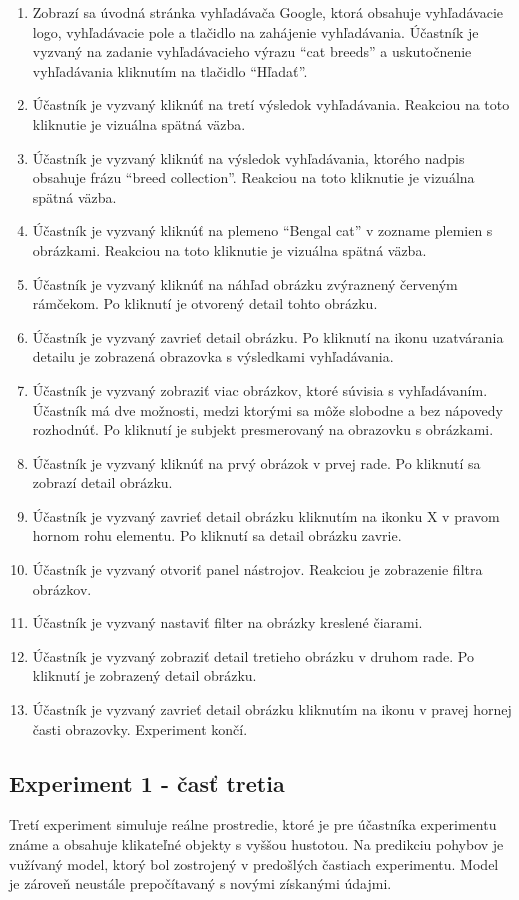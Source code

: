 {\small{}
\begin{enumerate}
\item Zobrazí sa úvodná stránka vyhľadávača Google, ktorá obsahuje vyhľadávacie logo, vyhľadávacie pole a tlačidlo na zahájenie vyhľadávania. Účastník je vyzvaný na zadanie vyhľadávacieho výrazu “cat breeds” a uskutočnenie vyhľadávania kliknutím na tlačidlo “Hľadať”.
\item Účastník je vyzvaný kliknúť na tretí výsledok vyhľadávania. Reakciou na toto kliknutie je vizuálna spätná väzba.
\item Účastník je vyzvaný kliknúť na výsledok vyhľadávania, ktorého nadpis obsahuje frázu “breed collection”. Reakciou na toto kliknutie je vizuálna spätná väzba.
\item Účastník je vyzvaný kliknúť na plemeno “Bengal cat” v zozname plemien s obrázkami. Reakciou na toto kliknutie je vizuálna spätná väzba.
\item Účastník je vyzvaný kliknúť na náhľad obrázku zvýraznený červeným rámčekom. Po kliknutí je otvorený detail tohto obrázku. 
\item Účastník je vyzvaný zavrieť detail obrázku. Po kliknutí na ikonu uzatvárania detailu je zobrazená obrazovka s výsledkami vyhľadávania.
\item Účastník je vyzvaný zobraziť viac obrázkov, ktoré súvisia s vyhľadávaním. Účastník má dve možnosti, medzi ktorými sa môže slobodne a bez nápovedy rozhodnúť. Po kliknutí je subjekt presmerovaný na obrazovku s obrázkami.
\item Účastník je vyzvaný kliknúť na prvý obrázok v prvej rade. Po kliknutí sa zobrazí detail obrázku.
\item Účastník je vyzvaný zavrieť detail obrázku kliknutím na ikonku X v pravom hornom rohu elementu. Po kliknutí sa detail obrázku zavrie.
\item Účastník je vyzvaný otvoriť panel nástrojov. Reakciou je zobrazenie filtra obrázkov.
\item Účastník je vyzvaný nastaviť filter na obrázky kreslené čiarami.
\item Účastník je vyzvaný zobraziť detail tretieho obrázku v druhom rade. Po kliknutí je zobrazený detail obrázku.
\item Účastník je vyzvaný zavrieť detail obrázku kliknutím na ikonu v pravej hornej časti obrazovky. Experiment končí.
\end{enumerate}
}

\subsection{Experiment 1 - časť tretia}
Tretí experiment simuluje reálne prostredie, ktoré je pre účastníka experimentu známe a obsahuje klikateľné objekty s vyššou hustotou. Na predikciu pohybov je vužívaný model, ktorý bol zostrojený v predošlých častiach experimentu. Model je zároveň neustále prepočítavaný s novými získanými údajmi.

